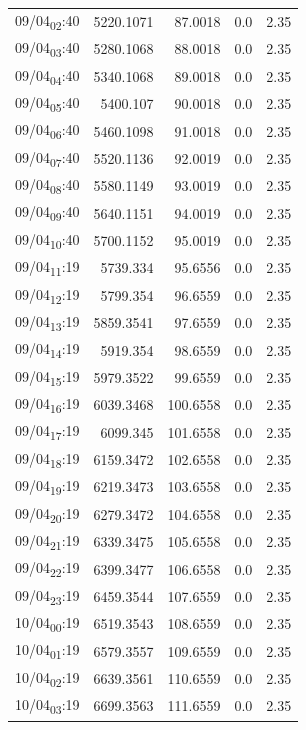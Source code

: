 \documentclass[11pt]{article}
\begin{document}
\begin{center}
\begin{tabular}{lrrrr}
09/04\textsubscript{02}:40 & 5220.1071 & 87.0018 & 0.0 & 2.35\\[0pt]
09/04\textsubscript{03}:40 & 5280.1068 & 88.0018 & 0.0 & 2.35\\[0pt]
09/04\textsubscript{04}:40 & 5340.1068 & 89.0018 & 0.0 & 2.35\\[0pt]
09/04\textsubscript{05}:40 & 5400.107 & 90.0018 & 0.0 & 2.35\\[0pt]
09/04\textsubscript{06}:40 & 5460.1098 & 91.0018 & 0.0 & 2.35\\[0pt]
09/04\textsubscript{07}:40 & 5520.1136 & 92.0019 & 0.0 & 2.35\\[0pt]
09/04\textsubscript{08}:40 & 5580.1149 & 93.0019 & 0.0 & 2.35\\[0pt]
09/04\textsubscript{09}:40 & 5640.1151 & 94.0019 & 0.0 & 2.35\\[0pt]
09/04\textsubscript{10}:40 & 5700.1152 & 95.0019 & 0.0 & 2.35\\[0pt]
09/04\textsubscript{11}:19 & 5739.334 & 95.6556 & 0.0 & 2.35\\[0pt]
09/04\textsubscript{12}:19 & 5799.354 & 96.6559 & 0.0 & 2.35\\[0pt]
09/04\textsubscript{13}:19 & 5859.3541 & 97.6559 & 0.0 & 2.35\\[0pt]
09/04\textsubscript{14}:19 & 5919.354 & 98.6559 & 0.0 & 2.35\\[0pt]
09/04\textsubscript{15}:19 & 5979.3522 & 99.6559 & 0.0 & 2.35\\[0pt]
09/04\textsubscript{16}:19 & 6039.3468 & 100.6558 & 0.0 & 2.35\\[0pt]
09/04\textsubscript{17}:19 & 6099.345 & 101.6558 & 0.0 & 2.35\\[0pt]
09/04\textsubscript{18}:19 & 6159.3472 & 102.6558 & 0.0 & 2.35\\[0pt]
09/04\textsubscript{19}:19 & 6219.3473 & 103.6558 & 0.0 & 2.35\\[0pt]
09/04\textsubscript{20}:19 & 6279.3472 & 104.6558 & 0.0 & 2.35\\[0pt]
09/04\textsubscript{21}:19 & 6339.3475 & 105.6558 & 0.0 & 2.35\\[0pt]
09/04\textsubscript{22}:19 & 6399.3477 & 106.6558 & 0.0 & 2.35\\[0pt]
09/04\textsubscript{23}:19 & 6459.3544 & 107.6559 & 0.0 & 2.35\\[0pt]
10/04\textsubscript{00}:19 & 6519.3543 & 108.6559 & 0.0 & 2.35\\[0pt]
10/04\textsubscript{01}:19 & 6579.3557 & 109.6559 & 0.0 & 2.35\\[0pt]
10/04\textsubscript{02}:19 & 6639.3561 & 110.6559 & 0.0 & 2.35\\[0pt]
10/04\textsubscript{03}:19 & 6699.3563 & 111.6559 & 0.0 & 2.35\\[0pt]
\end{tabular}
\end{center}
\end{document}
